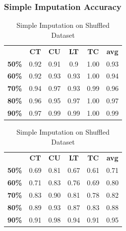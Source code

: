 \documentclass{article}
\begin{document}
\subsubsection{Simple Imputation Accuracy}

\begin{table}[h]
\begin{minipage}{.45\textwidth}\centering
\begin{tabular}{cccccc}
			  & \textbf{CT} & \textbf{CU} & \textbf{LT} & \textbf{TC} & \textbf{avg} \\
\textbf{50\%} & 0.92        & 0.91        & 0.9         & 1.00        & 0.93 \\
\textbf{60\%} & 0.92        & 0.93        & 0.93        & 1.00        & 0.94 \\
\textbf{70\%} & 0.94        & 0.97        & 0.93        & 0.99        & 0.96 \\
\textbf{80\%} & 0.96        & 0.95        & 0.97        & 1.00        & 0.97 \\
\textbf{90\%} & 0.97        & 0.99        & 0.99        & 1.00        & 0.99
\end{tabular}
\caption{Simple Imputation}
\end{minipage}
\hfill
\begin{minipage}{.5\textwidth}\centering
\begin{tabular}{cccccc}
			  & \textbf{CT} & \textbf{CU} & \textbf{LT} & \textbf{TC} & \textbf{avg} \\
\textbf{50\%} & 0.69        & 0.81        & 0.67        & 0.61        & 0.71 \\
\textbf{60\%} & 0.71        & 0.83        & 0.76        & 0.69        & 0.80 \\
\textbf{70\%} & 0.83        & 0.90        & 0.81        & 0.78        & 0.82 \\
\textbf{80\%} & 0.89        & 0.93        & 0.87        & 0.83        & 0.88 \\
\textbf{90\%} & 0.91        & 0.98        & 0.94        & 0.91        & 0.95
\end{tabular}
\caption{Simple Imputation on Shuffled Dataset}
\end{minipage}
\end{table}
\end{document}
